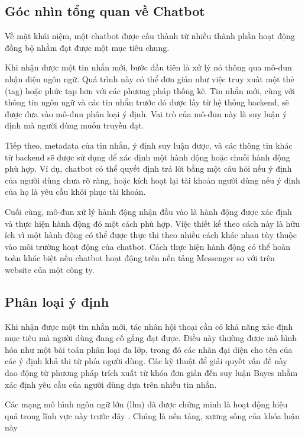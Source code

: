 \subsection{Góc nhìn tổng quan về Chatbot}
\label{subsection:overview}


Về mặt khái niệm, một chatbot được cấu thành từ nhiều thành phần hoạt động đồng bộ nhằm đạt được một mục tiêu chung.


Khi nhận được một tin nhắn mới, bước đầu tiên là xử lý nó thông qua mô-đun nhận diện ngôn ngữ. Quá trình này có thể đơn giản như việc truy xuất một thẻ (tag) hoặc phức tạp hơn với các phương pháp thống kê. Tin nhắn mới, cùng với thông tin ngôn ngữ và các tin nhắn trước đó được lấy từ hệ thống backend, sẽ được đưa vào mô-đun phân loại ý định. Vai trò của mô-đun này là suy luận ý định mà người dùng muốn truyền đạt.


Tiếp theo, metadata của tin nhắn, ý định suy luận được, và các thông tin khác từ backend sẽ được sử dụng để xác định một hành động hoặc chuỗi hành động phù hợp. Ví dụ, chatbot có thể quyết định trả lời bằng một câu hỏi nếu ý định của người dùng chưa rõ ràng, hoặc kích hoạt lại tài khoản người dùng nếu ý định của họ là yêu cầu khôi phục tài khoản.


Cuối cùng, mô-đun xử lý hành động nhận đầu vào là hành động được xác định và thực hiện hành động đó một cách phù hợp. Việc thiết kế theo cách này là hữu ích vì một hành động có thể được thực thi theo nhiều cách khác nhau tùy thuộc vào môi trường hoạt động của chatbot. Cách thực hiện hành động có thể hoàn toàn khác biệt nếu chatbot hoạt động trên nền tảng Messenger so với trên website của một công ty.


\subsection{Phân loại ý định}
\label{subsection:intent_classification}


Khi nhận được một tin nhắn mới, tác nhân hội thoại cần có khả năng xác định mục tiêu mà người dùng đang cố gắng đạt được. Điều này thường được mô hình hóa như một bài toán phân loại đa lớp, trong đó các nhãn đại diện cho tên của các ý định khả thi từ phía người dùng. Các kỹ thuật để giải quyết vấn đề này dao động từ phương pháp trích xuất từ khóa đơn giản đến suy luận Bayes nhằm xác định yêu cầu của người dùng dựa trên nhiều tin nhắn.


Các mạng mô hình ngôn ngữ lớn (\gls{llm}) đã được chứng minh là hoạt động hiệu quả trong lĩnh vực này trước đây \cite{gao2023retrievalaugmented}. Chúng là nền tảng, xương sống của khóa luận này


